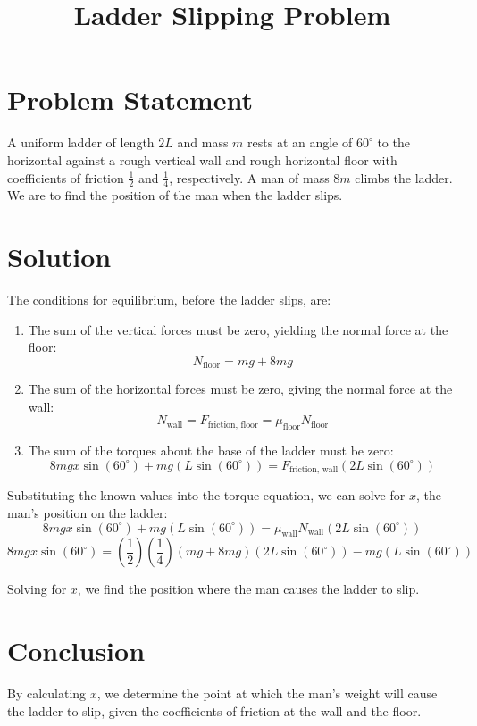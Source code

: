 \documentclass{article}
\begin{document}
\title{Ladder Slipping Problem}
\date{}
\maketitle

\section*{Problem Statement}
A uniform ladder of length \( 2L \) and mass \( m \) rests at an angle of \( 60^\circ \) to the horizontal against a rough vertical wall and rough horizontal floor with coefficients of friction \( \frac{1}{2} \) and \( \frac{1}{4} \), respectively. A man of mass \( 8m \) climbs the ladder. We are to find the position of the man when the ladder slips.

\section*{Solution}
The conditions for equilibrium, before the ladder slips, are:
\begin{enumerate}
    \item The sum of the vertical forces must be zero, yielding the normal force at the floor:
    \[ N_{\text{floor}} = m g + 8m g \]
    \item The sum of the horizontal forces must be zero, giving the normal force at the wall:
    \[ N_{\text{wall}} = F_{\text{friction, floor}} = \mu_{\text{floor}} N_{\text{floor}} \]
    \item The sum of the torques about the base of the ladder must be zero:
    \[ 8m g x \sin(60^\circ) + m g (L \sin(60^\circ)) = F_{\text{friction, wall}} (2L \sin(60^\circ)) \]
\end{enumerate}

Substituting the known values into the torque equation, we can solve for \( x \), the man's position on the ladder:
\[ 8m g x \sin(60^\circ) + m g (L \sin(60^\circ)) = \mu_{\text{wall}} N_{\text{wall}} (2L \sin(60^\circ)) \]
\[ 8m g x \sin(60^\circ) = \left(\frac{1}{2} \right) \left(\frac{1}{4} \right) (m g + 8m g) (2L \sin(60^\circ)) - m g (L \sin(60^\circ)) \]

Solving for \( x \), we find the position where the man causes the ladder to slip.

\section*{Conclusion}
By calculating \( x \), we determine the point at which the man's weight will cause the ladder to slip, given the coefficients of friction at the wall and the floor.
\end{document}
